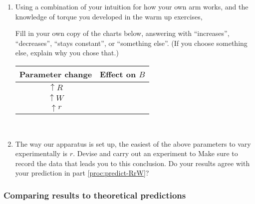 \begin{enumerate}[labproc]
\item \label{proc:predict-RrW}
Using a combination of your intuition for how your own arm works,
and the knowledge of torque you developed in the warm up exercises,

Fill in your own copy of the charts below, 
answering with ``increases'', ``decreases'', 
``stays constant'', or ``something else''.  
(If you choose something else, explain why you chose that.)
\vspace{.5cm}
\\
\begin{tabular}{|c||c|}
	\hline
	Parameter change & Effect on $B$ 
	\\ \hline \hline
	$\uparrow R$ 
	& 
	\hphantom{Here is some text that is a bit long}
	\\ \hline
	$\uparrow W$ 
	& 
	\\ \hline
	$\uparrow r$
	&
	\\ \hline
\end{tabular}\\



\item
The way our apparatus is set up, 
the easiest of the above parameters to vary experimentally is $r$.
Devise and carry out an experiment to 
Make sure to record the data that leads you to this conclusion.
Do your results agree with your prediction 
in part \ref{proc:predict-RrW}?



\end{enumerate}



\subsubsection*{Comparing results to theoretical predictions}

